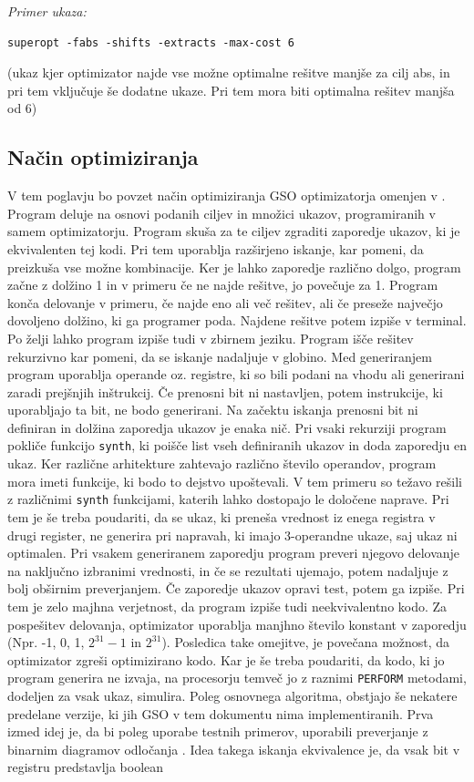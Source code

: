 \documentclass[a4paper, 12pt]{book}
\begin{document}
	\noindent
	{\it Primer ukaza:}
	\begin{Verbatim}[baselinestretch=1]
superopt -fabs -shifts -extracts -max-cost 6
	\end{Verbatim}
	\noindent
	{\small (ukaz kjer optimizator najde vse možne optimalne rešitve manjše za cilj abs, in pri tem vključuje še dodatne ukaze. Pri tem mora biti optimalna rešitev manjša od 6)}
	\subsection{Način optimiziranja}
	
	V tem poglavju bo povzet način optimiziranja GSO optimizatorja omenjen v \cite{url1,pdf4,pdf2}. Program deluje na osnovi podanih ciljev in množici ukazov, programiranih v samem optimizatorju. Program skuša za te ciljev zgraditi zaporedje ukazov, ki je ekvivalenten tej kodi. Pri tem uporablja razširjeno iskanje, kar pomeni, da preizkuša vse možne kombinacije. Ker je lahko zaporedje različno dolgo, program začne z dolžino 1 in v primeru če ne najde rešitve, jo povečuje za 1. Program konča delovanje v primeru, če najde eno ali več rešitev, ali če preseže največjo dovoljeno dolžino, ki ga programer poda. Najdene rešitve potem izpiše v terminal. Po želji lahko program izpiše tudi v zbirnem jeziku. Program išče rešitev rekurzivno kar pomeni, da se iskanje nadaljuje v globino. Med generiranjem program uporablja operande oz. registre, ki so bili podani na vhodu ali generirani zaradi prejšnjih inštrukcij. Če prenosni bit ni nastavljen, potem instrukcije, ki uporabljajo ta bit, ne bodo generirani. Na začektu iskanja prenosni bit ni definiran in dolžina zaporedja ukazov je enaka nič. Pri vsaki rekurziji program pokliče funkcijo \texttt{synth}, ki poišče list vseh definiranih ukazov in doda zaporedju en ukaz. Ker različne arhitekture zahtevajo različno število operandov, program mora imeti funkcije, ki bodo to dejstvo upoštevali. V tem primeru so težavo rešili z različnimi \texttt{synth} funkcijami, katerih lahko dostopajo le določene naprave. Pri tem je še treba poudariti, da se ukaz, ki preneša vrednost iz enega registra v drugi register, ne generira pri napravah, ki imajo 3-operandne ukaze, saj ukaz ni optimalen. Pri vsakem generiranem zaporedju program preveri njegovo delovanje na naključno izbranimi vrednosti, in če se rezultati ujemajo, potem nadaljuje z bolj obširnim preverjanjem. Če zaporedje ukazov opravi test, potem ga izpiše. Pri tem je zelo majhna verjetnost, da program izpiše tudi neekvivalentno kodo. Za pospešitev delovanja, optimizator uporablja manjhno število konstant v zaporedju (Npr. -1, 0, 1, \(2^{31}-1\) in \(2^{31}\)). Posledica take omejitve, je povečana možnost, da optimizator zgreši optimizirano kodo. Kar je še treba poudariti, da kodo, ki jo program generira ne izvaja, na procesorju temveč jo z raznimi \texttt{PERFORM} metodami, dodeljen za vsak ukaz, simulira. Poleg osnovnega algoritma, obstjajo še nekatere predelane verzije, ki jih GSO v tem dokumentu nima implementiranih. Prva izmed idej je, da bi poleg uporabe testnih primerov, uporabili preverjanje z binarnim diagramov odločanja \cite{pdf6}. Idea takega iskanja ekvivalence je, da vsak bit v registru predstavlja boolean 
\end{document}
